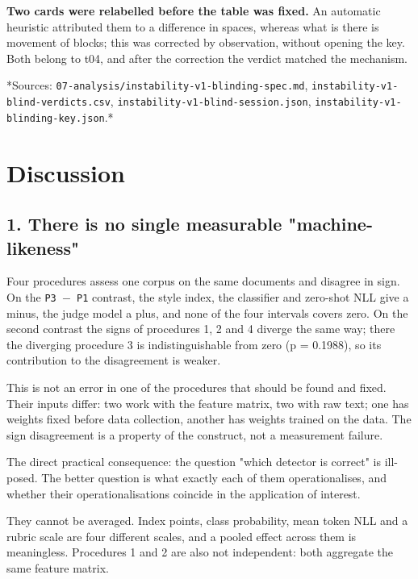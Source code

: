 \documentclass[11pt,a4paper]{article}
\renewcommand{\_}{\textunderscore\allowbreak}
\begin{document}
\textbf{Two cards were relabelled before the table was fixed.} An automatic heuristic
attributed them to a difference in spaces, whereas what is there is movement of blocks;
this was corrected by observation, without opening the key. Both belong to t04, and
after the correction the verdict matched the mechanism.

*Sources: \texttt{07-\allowbreak{}analysis/instability-\allowbreak{}v1-\allowbreak{}blinding-\allowbreak{}spec.md},
\texttt{instability-\allowbreak{}v1-\allowbreak{}blind-\allowbreak{}verdicts.csv}, \texttt{instability-\allowbreak{}v1-\allowbreak{}blind-\allowbreak{}session.json},
\texttt{instability-\allowbreak{}v1-\allowbreak{}blinding-\allowbreak{}key.json}.*

\section{Discussion}

\subsection{1. There is no single measurable "machine-likeness"}

Four procedures assess one corpus on the same documents and disagree in sign.
On the \texttt{P3 $-$ P1} contrast, the style index, the classifier and zero-shot NLL give
a minus, the judge model a plus, and none of the four intervals covers zero. On
the second contrast the signs of procedures 1, 2 and 4 diverge the same way;
there the diverging procedure 3 is indistinguishable from zero (p = 0.1988), so
its contribution to the disagreement is weaker.

This is not an error in one of the procedures that should be found and fixed.
Their inputs differ: two work with the feature matrix, two with raw text; one has
weights fixed before data collection, another has weights trained on the data.
The sign disagreement is a property of the construct, not a measurement failure.

The direct practical consequence: the question "which detector is correct" is
ill-posed. The better question is what exactly each of them operationalises, and
whether their operationalisations coincide in the application of interest.

They cannot be averaged. Index points, class probability, mean token NLL and a
rubric scale are four different scales, and a pooled effect across them is
meaningless. Procedures 1 and 2 are also not independent: both aggregate the same
feature matrix.
\end{document}
